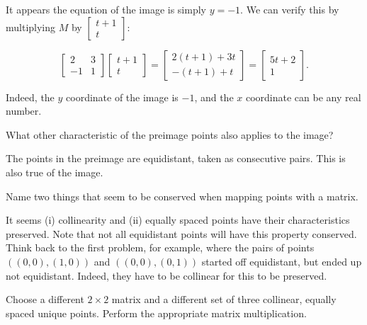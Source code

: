 \documentclass[../key.tex]{subfiles}
\begin{document}
It appears the equation of the image is simply $y=-1$. We can verify this by multiplying $M$ by $\begin{bmatrix} t+1 \\ t \end{bmatrix}$:

$$\begin{bmatrix} 2 & 3 \\ -1 & 1 \end{bmatrix} \begin{bmatrix} t+1 \\ t \end{bmatrix} = \begin{bmatrix} 2(t+1) + 3t \\ -(t+1) + t \end{bmatrix} = \begin{bmatrix} 5t + 2 \\ 1 \end{bmatrix}.$$

Indeed, the $y$ coordinate of the image is $-1$, and the $x$ coordinate can be any real number.

\begin{inner_problem}
\item What other characteristic of the preimage points also applies to the image?
\end{inner_problem}

The points in the preimage are equidistant, taken as consecutive pairs. This is also true of the image.

\begin{inner_problem}
\item Name two things that seem to be conserved when mapping points with a matrix.
\end{inner_problem}

It seems (i) collinearity and (ii) equally spaced points have their characteristics preserved. Note that not all equidistant points will have this property conserved. Think back to the first problem, for example, where the pairs of points $((0,0),(1,0))$ and $((0,0),(0,1))$ started off equidistant, but ended up not equidistant. Indeed, they have to be collinear for this to be preserved.

\begin{outer_problem}
\item
\end{outer_problem}

\begin{inner_problem}[start=1]
\item Choose a different $2\times 2$ matrix and a different set of three collinear, equally spaced unique points. Perform the appropriate matrix multiplication.
\end{inner_problem}
\end{document}
